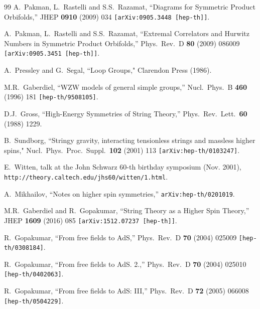 \documentclass[12pt,a4paper]{article}
\begin{document}
\begin{thebibliography}{99}
A.~Pakman, L.~Rastelli and S.S.~Razamat,
``Diagrams for Symmetric Product Orbifolds,''
JHEP {\bf 0910} (2009) 034
{\tt [arXiv:0905.3448 [hep-th]]}.

A.~Pakman, L.~Rastelli and S.S.~Razamat,
``Extremal Correlators and Hurwitz Numbers in Symmetric Product Orbifolds,''
Phys.\ Rev.\ D {\bf 80} (2009) 086009
{\tt [arXiv:0905.3451 [hep-th]]}.

A.~Pressley and G.~Segal, 
``Loop Groups," Clarendon Press (1986).

M.R.~Gaberdiel,
``WZW models of general simple groups,''
Nucl.\ Phys.\ B {\bf 460} (1996) 181
{\tt [hep-th/9508105]}.

D.J.~Gross,
``High-Energy Symmetries of String Theory,''
Phys.\ Rev.\ Lett.\  {\bf 60} (1988) 1229.
  
B.~Sundborg,
``Stringy gravity, interacting tensionless strings and massless higher spins,"
Nucl.\ Phys.\ Proc.\ Suppl.\  {\bf 102} (2001) 113
{\tt [arXiv:hep-th/0103247]}.
  
E.~Witten, talk at the John Schwarz 60-th birthday symposium (Nov. 2001), \newline
{\tt http://theory.caltech.edu/jhs60/witten/1.html}.

A.~Mikhailov,
``Notes on higher spin symmetries,''
{\tt arXiv:hep-th/0201019}.

M.R.~Gaberdiel and R.~Gopakumar,
``String Theory as a Higher Spin Theory,''
JHEP {\bf 1609} (2016) 085
{\tt [arXiv:1512.07237 [hep-th]]}.

 R.~Gopakumar,
``From free fields to AdS,''
Phys.\ Rev.\ D {\bf 70} (2004) 025009 
{\tt  [hep-th/0308184]}.
  
  R.~Gopakumar,
  ``From free fields to AdS. 2.,''
  Phys.\ Rev.\ D {\bf 70} (2004) 025010 
{\tt  [hep-th/0402063]}. 
 
  R.~Gopakumar,
  ``From free fields to AdS: III,''
  Phys.\ Rev.\ D {\bf 72} (2005) 066008 
{\tt  [hep-th/0504229]}.
  

\end{thebibliography}
\end{document}
